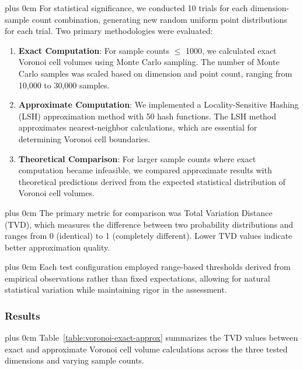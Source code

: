 \documentclass[conference]{IEEEtran}
\newcommand{\justifytext}{\leftskip=0pt \rightskip=0pt plus 0cm}
\begin{document}
\justifytext
For statistical significance, we conducted 10 trials for each dimension-sample count combination, generating new random uniform point distributions for each trial. Two primary methodologies were evaluated:

\begin{enumerate}
    \item \textbf{Exact Computation}: For sample counts $\leq$ 1000, we calculated exact Voronoi cell volumes using Monte Carlo sampling. The number of Monte Carlo samples was scaled based on dimension and point count, ranging from 10,000 to 30,000 samples.
    
    \item \textbf{Approximate Computation}: We implemented a Locality-Sensitive Hashing (LSH) approximation method with 50 hash functions. The LSH method approximates nearest-neighbor calculations, which are essential for determining Voronoi cell boundaries.
    
    \item \textbf{Theoretical Comparison}: For larger sample counts where exact computation became infeasible, we compared approximate results with theoretical predictions derived from the expected statistical distribution of Voronoi cell volumes.
\end{enumerate}

\justifytext
The primary metric for comparison was Total Variation Distance (TVD), which measures the difference between two probability distributions and ranges from 0 (identical) to 1 (completely different). Lower TVD values indicate better approximation quality.

\justifytext
Each test configuration employed range-based thresholds derived from empirical observations rather than fixed expectations, allowing for natural statistical variation while maintaining rigor in the assessment.

\subsubsection{Results}

\justifytext
Table~\ref{table:voronoi-exact-approx} summarizes the TVD values between exact and approximate Voronoi cell volume calculations across the three tested dimensions and varying sample counts.
\end{document}
